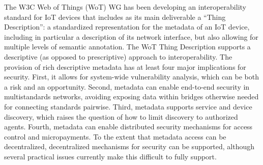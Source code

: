 The W3C Web of Things (WoT) WG has been developing an interoperability standard for IoT devices that includes as
its main deliverable a ``Thing Description'': a standardized representation for the metadata of an 
IoT device, including in particular a description of its network interface,
but also allowing for multiple levels of semantic annotation.
The WoT Thing Description supports a descriptive (as opposed to prescriptive) approach to interoperability.
The provision of rich descriptive metadata has at least four major implications for security.
First, it allows for system-wide vulnerability analysis, 
which can be both a risk and an opportunity.
Second, metadata can enable end-to-end security in multistandards networks,
avoiding exposing data within bridges otherwise needed for connecting standards pairwise.
Third, metadata supports service and device discovery,
which raises the question of how to limit discovery to authorized agents.
Fourth, metadata can enable distributed security mechanisms for access control and micropayments.
To the extent that metadata access can be decentralized, decentralized mechanisms for security can
be supported, although several practical issues currently make this difficult to fully support.
